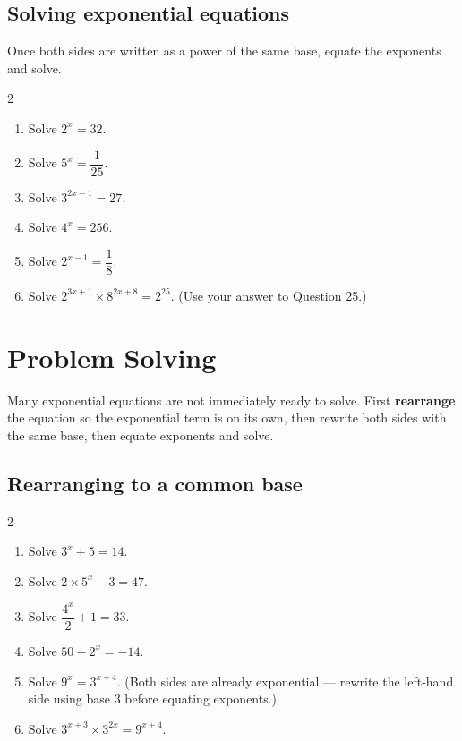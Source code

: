 \documentclass[11pt]{article}
\newcommand{\qspace}{\vspace{0.65cm}}
\newenvironment{qtwocol}{\begin{multicols}{2}\begin{enumerate}[resume]}{\end{enumerate}\end{multicols}}
\newenvironment{qtwocolstart}{\begin{multicols}{2}\begin{enumerate}}{\end{enumerate}\end{multicols}}
\begin{document}
\subsection*{Solving exponential equations}
Once both sides are written as a power of the same base, equate the exponents and solve.

\begin{qtwocol}
  \item Solve $2^x = 32$.
  \qspace
  \item Solve $5^x = \dfrac{1}{25}$.
  \qspace
  \item Solve $3^{2x-1} = 27$.
  \qspace
  \item Solve $4^{x} = 256$.
  \qspace
  \item Solve $2^{x-1} = \dfrac{1}{8}$.
  \qspace
  \item Solve $2^{3x+1} \times 8^{2x+8} = 2^{25}$. (Use your answer to Question 25.)
  \qspace
\end{qtwocol}

\newpage
\section{Problem Solving}

\noindent Many exponential equations are not immediately ready to solve. First \textbf{rearrange} the equation so the exponential term is on its own, then rewrite both sides with the same base, then equate exponents and solve.

\subsection*{Rearranging to a common base}
\begin{qtwocolstart}
  \item Solve $3^x + 5 = 14$.
  \qspace

  \item Solve $2 \times 5^x - 3 = 47$.
  \qspace

  \item Solve $\dfrac{4^x}{2} + 1 = 33$.
  \qspace

  \item Solve $50 - 2^x = -14$.
  \qspace

  \item Solve $9^x = 3^{x+4}$. (Both sides are already exponential --- rewrite the left-hand side using base 3 before equating exponents.)
  \qspace

  \item Solve $3^{x+3} \times 3^{2x} = 9^{x+4}$.
  \qspace
\end{qtwocolstart}
\end{document}
